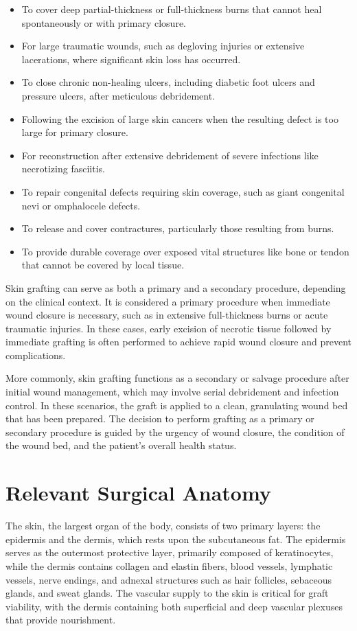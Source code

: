 \begin{itemize}
  \item To cover deep partial-thickness or full-thickness burns that cannot heal spontaneously or with primary closure.
  \item For large traumatic wounds, such as degloving injuries or extensive lacerations, where significant skin loss has occurred.
  \item To close chronic non-healing ulcers, including diabetic foot ulcers and pressure ulcers, after meticulous debridement.
  \item Following the excision of large skin cancers when the resulting defect is too large for primary closure.
  \item For reconstruction after extensive debridement of severe infections like necrotizing fasciitis.
  \item To repair congenital defects requiring skin coverage, such as giant congenital nevi or omphalocele defects.
  \item To release and cover contractures, particularly those resulting from burns.
  \item To provide durable coverage over exposed vital structures like bone or tendon that cannot be covered by local tissue.
\end{itemize}

Skin grafting can serve as both a primary and a secondary procedure, depending on the clinical context. It is considered a primary procedure when immediate wound closure is necessary, such as in extensive full-thickness burns or acute traumatic injuries. In these cases, early excision of necrotic tissue followed by immediate grafting is often performed to achieve rapid wound closure and prevent complications.

More commonly, skin grafting functions as a secondary or salvage procedure after initial wound management, which may involve serial debridement and infection control. In these scenarios, the graft is applied to a clean, granulating wound bed that has been prepared. The decision to perform grafting as a primary or secondary procedure is guided by the urgency of wound closure, the condition of the wound bed, and the patient's overall health status.

\section*{Relevant Surgical Anatomy}
The skin, the largest organ of the body, consists of two primary layers: the epidermis and the dermis, which rests upon the subcutaneous fat. The epidermis serves as the outermost protective layer, primarily composed of keratinocytes, while the dermis contains collagen and elastin fibers, blood vessels, lymphatic vessels, nerve endings, and adnexal structures such as hair follicles, sebaceous glands, and sweat glands. The vascular supply to the skin is critical for graft viability, with the dermis containing both superficial and deep vascular plexuses that provide nourishment.

